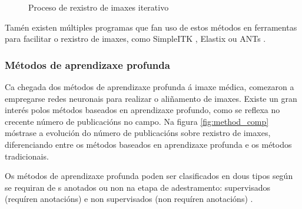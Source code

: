 \begin{figure}[tbp]
\centering
{}
\caption{Proceso de rexistro de imaxes iterativo}
\label{fig:rexistro_iterativo}
\end{figure}

Tamén existen múltiples programas que fan uso de estos métodos en ferramentas para facilitar o rexistro de imaxes, como SimpleITK \cite{simpleitk}, Elastix \cite{elastix} ou ANTs \cite{ants}.

\subsubsection{Métodos de aprendizaxe profunda}
\label{subsubsec:Métodos de aprendizaxe profunda}

Ca chegada dos métodos de aprendizaxe profunda á imaxe médica, comezaron a empregarse redes neuronais para realizar o aliñamento de imaxes.
Existe un gran interés polos métodos baseados en aprendizaxe profundo, como se reflexa no crecente número de publicacións no campo. Na figura \ref{fig:method_comp} móstrase a evolución do número de publicacións sobre rexistro de imaxes, diferenciando entre os métodos baseados en aprendizaxe profunda e os métodos tradicionais.

Os métodos de aprendizaxe profunda poden ser clasificados en dous tipos según se requiran de s anotados ou non na etapa de adestramento:
supervisados (requíren anotacións) e non supervisados (non requíren anotacións) \cite{nie2024medicalimageregistrationapplication}.

